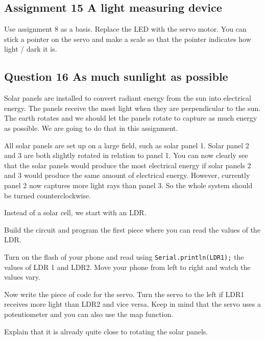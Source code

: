 \documentclass{arduino}
\begin{document}
\subsection{Assignment 15 A light measuring device}

Use assignment 8 as a basis. Replace the LED with the servo motor. You can stick a pointer on the servo and make a scale so that the pointer indicates how light / dark it is.

\subsection{Question 16 As much sunlight as possible}


Solar panels are installed to convert radiant energy from the sun into electrical energy. The panels receive the most light when they are perpendicular to the sun. The earth rotates and we should let the panels rotate to capture as much energy as possible. We are going to do that in this assignment.

All solar panels are set up on a large field, such as solar panel 1. Solar panel 2 and 3 are both slightly rotated in relation to panel 1. You can now clearly see that the solar panels would produce the most electrical energy if solar panels 2 and 3 would produce the same amount of electrical energy. However, currently panel 2 now captures more light rays than panel 3. So the whole system should be turned counterclockwise.

\newpage

Instead of a solar cell, we start with an LDR.

\begin{alphalist}
\item Build the circuit and program the first piece where you can read the values ​​of the LDR.

\item Turn on the flash of your phone and read using \lstinline{Serial.println(LDR1);} the values ​​of LDR 1 and LDR2. Move your phone from left to right and watch the values ​​vary.

\item Now write the piece of code for the servo. Turn the servo to the left if LDR1 receives more light than LDR2 and vice versa. Keep in mind that the servo uses a potentiometer and you can also use the map function.

\item Explain that it is already quite close to rotating the solar panels.
\end{alphalist}
\end{document}

